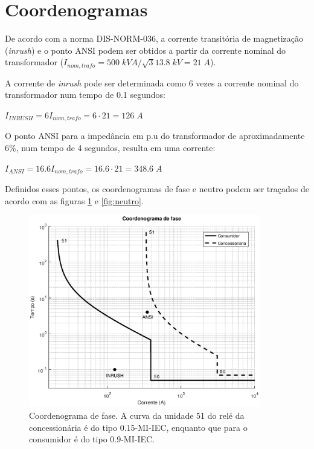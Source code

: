 \section{Coordenogramas}



De acordo com a norma DIS-NORM-036, a corrente transitória de magnetização (\textit{inrush}) e o ponto ANSI podem ser obtidos a partir da corrente nominal do transformador ($I_{nom,trafo} = 500 \; kVA / \sqrt{3} 13.8 \; kV = 21 \; A$). 

A corrente de \textit{inrush} pode ser determinada como 6 vezes a corrente nominal do transformador num tempo de 0.1 segundos:

\begin{center}
$I_{INRUSH} = 6I_{nom,trafo} = 6 \cdot 21 = 126 \; A$ \\ 
\end{center}

O ponto ANSI para a impedância em p.u do transformador de aproximadamente 6\%, num tempo de 4 segundos, resulta em uma corrente:

\begin{center}
$I_{ANSI} = 16.6I_{nom,trafo} = 16.6 \cdot 21 = 348.6 \; A$ \\ 
\end{center}

Definidos esses pontos, os coordenogramas de fase e neutro podem ser traçados de acordo com as figuras \ref{fig:fase} e \ref{fig:neutro}.

\begin{figure}[H] 
    \centering
    \includegraphics[width=0.9\textwidth]{images/fase.eps}
    \caption{Coordenograma de fase. A curva da unidade 51 do relé da concessionária é do tipo 0.15-MI-IEC, enquanto que para o consumidor é do tipo 0.9-MI-IEC.}
    \label{fig:fase}
\end{figure}

